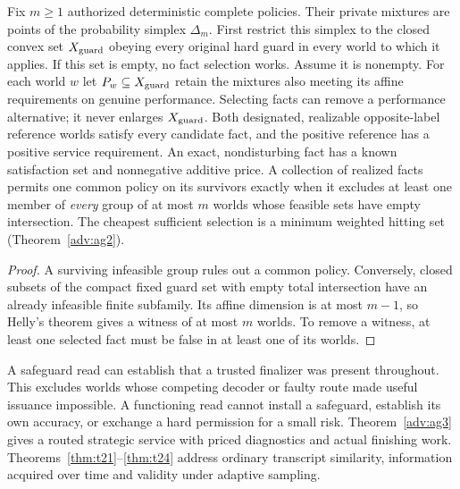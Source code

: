 \begin{theorem}\label{body:blockers}
Fix \(m\ge1\) authorized deterministic complete policies. Their private mixtures are points of the probability simplex \(\Delta_m\). First restrict this simplex to the closed convex set \(X_{\rm guard}\) obeying every original hard guard in every world to which it applies. If this set is empty, no fact selection works. Assume it is nonempty. For each world \(w\) let \(P_w\subseteq X_{\rm guard}\) retain the mixtures also meeting its affine requirements on genuine performance. Selecting facts can remove a performance alternative; it never enlarges \(X_{\rm guard}\). Both designated, realizable opposite-label reference worlds satisfy every candidate fact, and the positive reference has a positive service requirement. An exact, nondisturbing fact has a known satisfaction set and nonnegative additive price. A collection of realized facts permits one common policy on its survivors exactly when it excludes at least one member of \emph{every} group of at most \(m\) worlds whose feasible sets have empty intersection. The cheapest sufficient selection is a minimum weighted hitting set (Theorem~\ref{adv:ag2}).
\end{theorem}
\begin{proof}
A surviving infeasible group rules out a common policy. Conversely, closed subsets of the compact fixed guard set with empty total intersection have an already infeasible finite subfamily. Its affine dimension is at most \(m-1\), so Helly's theorem gives a witness of at most \(m\) worlds. To remove a witness, at least one selected fact must be false in at least one of its worlds.
\end{proof}
A safeguard read can establish that a trusted finalizer was present throughout. This excludes worlds whose competing decoder or faulty route made useful issuance impossible. A functioning read cannot install a safeguard, establish its own accuracy, or exchange a hard permission for a small risk. Theorem~\ref{adv:ag3} gives a routed strategic service with priced diagnostics and actual finishing work. Theorems~\ref{thm:t21}--\ref{thm:t24} address ordinary transcript similarity, information acquired over time and validity under adaptive sampling.
